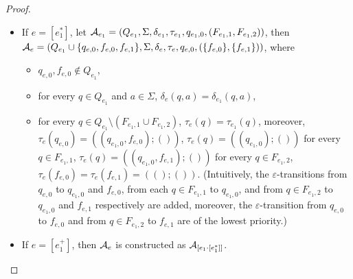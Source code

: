 \begin{proof}
\begin{itemize}
        \item If $e = [e_1^{\ast}]$, let  
            $\mathcal{A}_{e_1} = (Q_{e_1}, \Sigma, \delta_{e_1}, \tau_{e_1}, q_{e_1,0}, (F_{e_1,1}, F_{e_1,2}))$, then 
            $\mathcal{A}_e = (Q_{e_1} \cup \{q_{e,0}, f_{e,0}, f_{e,1}\}, \Sigma, \delta_e, \tau_e, q_{e,0}, (\{f_{e,0}\}, \{f_{e,1}\}))$, where 
            \begin{itemize}
                \item $q_{e,0}, f_{e,0} \not \in Q_{e_1}$,

                \item for every $q \in Q_{e_1}$ and $a \in \Sigma$, $\delta_e(q, a) = \delta_{e_1}(q, a)$, 

                \item for every $q \in Q_{e_1} \setminus (F_{e_1,1} \cup F_{e_1,2})$,  $\tau_e(q) = \tau_{e_1}(q)$, moreover, $\tau_e(q_{e,0}) = ((q_{e_1,0},f_{e,0}); ())$,  $\tau_e(q) = ((q_{e_1,0});())$ for every $q \in F_{e_1,1}$, $\tau_e(q) = ((q_{e_1,0}, f_{e,1});())$ for every $q \in F_{e_1,2}$, $\tau_e(f_{e,0}) =\tau_e(f_{e,1}) = (();())$. (Intuitively, the $\varepsilon$-transitions from $q_{e,0}$ to $q_{e_1,0}$ and $f_{e,0}$, from each $q \in F_{e_1,1}$ to $q_{e_1,0}$, and from $q \in F_{e_1,2}$ to $q_{e_1,0}$ and $f_{e,1}$ respectively are added, moreover, the $\varepsilon$-transition from $q_{e,0}$ to $f_{e,0}$ and from $q \in F_{e_1,2}$ to $f_{e,1}$ are of the lowest priority.)
            \end{itemize}
        \item If $e = [e_1^{+}]$, then $\mathcal{A}_e$ is constructed as $\mathcal{A}_{[e_1 \cdot [e^\ast_1]]}$.


\end{itemize}
\end{proof}
